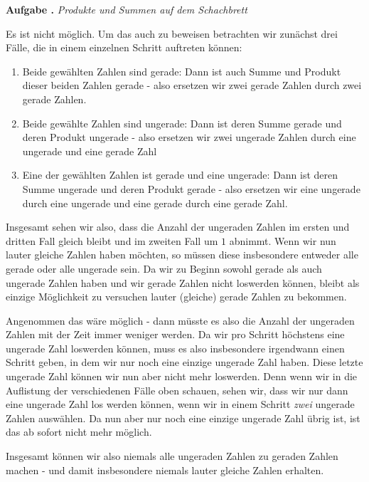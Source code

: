 \documentclass[a4paper,ngerman,12pt]{scrartcl}
\theoremstyle{definition}
\theoremstyle{plain}
\theoremstyle{remark}
\newlength{\aufgabenskip}
\newcounter{aufgabennummer}
\newenvironment{aufgabe}[1]{
	\addtocounter{aufgabennummer}{1}
	\textbf{Aufgabe \theaufgabennummer.} \emph{#1} \par
}{\vspace{\aufgabenskip}}
\begin{document}
\begin{aufgabe}{Produkte und Summen auf dem Schachbrett}
	Es ist nicht möglich. Um das auch zu beweisen betrachten wir zunächst drei Fälle, die in einem einzelnen Schritt auftreten können:
	\begin{enumerate}
		\item Beide gewählten Zahlen sind gerade: Dann ist auch Summe und Produkt dieser beiden Zahlen gerade - also ersetzen wir zwei gerade Zahlen durch zwei gerade Zahlen.
		\item Beide gewählte Zahlen sind ungerade: Dann ist deren Summe gerade und deren Produkt ungerade - also ersetzen wir zwei ungerade Zahlen durch eine ungerade und eine gerade Zahl
		\item Eine der gewählten Zahlen ist gerade und eine ungerade: Dann ist deren Summe ungerade und deren Produkt gerade - also ersetzen wir eine ungerade durch eine ungerade und eine gerade durch eine gerade Zahl.
	\end{enumerate}
	Insgesamt sehen wir also, dass die Anzahl der ungeraden Zahlen im ersten und dritten Fall gleich bleibt und im zweiten Fall um $1$ abnimmt. Wenn wir nun lauter gleiche Zahlen haben möchten, so müssen diese insbesondere entweder alle gerade oder alle ungerade sein. Da wir zu Beginn sowohl gerade als auch ungerade Zahlen haben und wir gerade Zahlen nicht loswerden können, bleibt als einzige Möglichkeit zu versuchen lauter (gleiche) gerade Zahlen zu bekommen.
	
	Angenommen das wäre möglich - dann müsste es also die Anzahl der ungeraden Zahlen mit der Zeit immer weniger werden. Da wir pro Schritt höchstens eine ungerade Zahl loswerden können, muss es also insbesondere irgendwann einen Schritt geben, in dem wir nur noch eine einzige ungerade Zahl haben. Diese letzte ungerade Zahl können wir nun aber nicht mehr loswerden. Denn wenn wir in die Auflistung der verschiedenen Fälle oben schauen, sehen wir, dass wir nur dann eine ungerade Zahl los werden können, wenn wir in einem Schritt \emph{zwei} ungerade Zahlen auswählen. Da nun aber nur noch eine einzige ungerade Zahl übrig ist, ist das ab sofort nicht mehr möglich.
	
	Insgesamt können wir also niemals alle ungeraden Zahlen zu geraden Zahlen machen - und damit insbesondere niemals lauter gleiche Zahlen erhalten.
\end{aufgabe}
\end{document}
